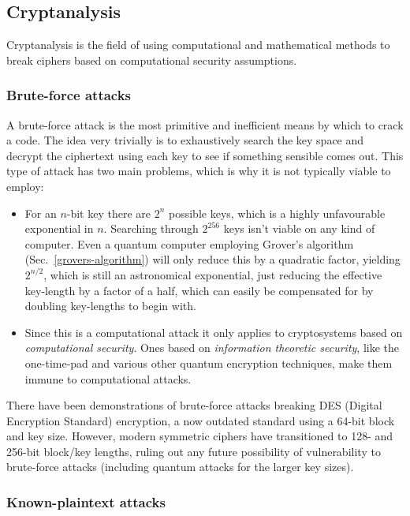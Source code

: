 \subsection{Cryptanalysis} \label{cryptanalysis}

Cryptanalysis is the field of using computational and mathematical methods to break ciphers based on computational security assumptions.

\subsubsection{Brute-force attacks} \label{brute-force-attacks}

A brute-force attack is the most primitive and inefficient means by which to crack a code. The idea very trivially is to exhaustively search the key space and decrypt the ciphertext using each key to see if something sensible comes out. This type of attack has two main problems, which is why it is not typically viable to employ:
\begin{itemize}
	\item For an $n$-bit key there are $2^n$ possible keys, which is a highly unfavourable exponential in $n$. Searching through $2^{256}$ keys isn't viable on any kind of computer. Even a quantum computer employing Grover's algorithm (Sec.~\ref{grovers-algorithm}) will only reduce this by a quadratic factor, yielding $2^{n/2}$, which is still an astronomical exponential, just reducing the effective key-length by a factor of a half, which can easily be compensated for by doubling key-lengths to begin with.
	\item Since this is a computational attack it only applies to cryptosystems based on \emph{computational security}. Ones based on \emph{information theoretic security}, like the one-time-pad and various other quantum encryption techniques, make them immune to computational attacks.
\end{itemize}

There have been demonstrations of brute-force attacks breaking DES (Digital Encryption Standard) encryption, a now outdated standard using a 64-bit block and key size. However, modern symmetric ciphers have transitioned to 128- and 256-bit block/key lengths, ruling out any future possibility of vulnerability to brute-force attacks (including quantum attacks for the larger key sizes).

\subsubsection{Known-plaintext attacks} \label{known-plaintext-attacks}

